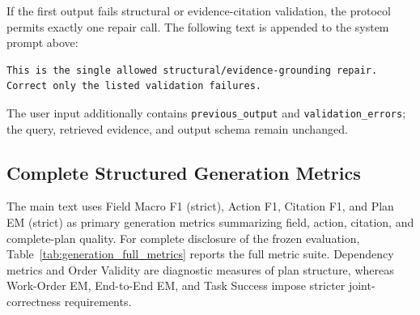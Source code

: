 If the first output fails structural or evidence-citation validation, the protocol permits exactly one repair call.
The following text is appended to the system prompt above:

\begin{lstlisting}
This is the single allowed structural/evidence-grounding repair.
Correct only the listed validation failures.
\end{lstlisting}

The user input additionally contains \texttt{previous\_output} and
\texttt{validation\_errors}; the query, retrieved evidence, and output schema remain unchanged.

\subsection{Complete Structured Generation Metrics}
\label{app:generation_full_metrics}

The main text uses Field Macro F1 (strict), Action F1, Citation F1, and Plan EM (strict)
as primary generation metrics summarizing field, action, citation, and complete-plan quality.
For complete disclosure of the frozen evaluation, Table~\ref{tab:generation_full_metrics} reports the full metric suite.
Dependency metrics and Order Validity are diagnostic measures of plan structure,
whereas Work-Order EM, End-to-End EM, and Task Success impose stricter joint-correctness requirements.

